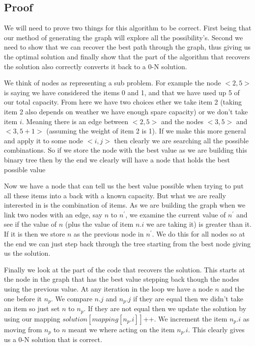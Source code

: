 \documentclass{article}
\begin{document}
		\break
		\subsection{Proof}
			We will need to prove two things for this algorithm to be correct. First being that our method of generating the graph will explore all the possibility's. Second we need to show that we can recover the best path through the graph, thus giving us the optimal solution and finally show that the part of the algorithm that recovers the solution also correctly converts it back to a 0-N solution.	\newline	
		
			We think of nodes as representing a sub problem. For example the node $<2, 5>$ is saying we have considered the items 0 and 1, and that we have used up 5 of our total capacity. From here we have two choices ether we take item 2 (taking item 2 also depends on weather we have enough spare capacity) or we don't take item $i$. Meaning there is an edge between $<2, 5>$ and the nodes $<3, 5>$ and $<3, 5 + 1>$ (assuming the weight of item 2 is 1). If we make this more general and apply it to some node $<i, j>$ then clearly we are searching all the possible combinations. So if we store the node with the best value as we are building this binary tree then by the end we clearly will have a node that holds the best possible value\newline
			
			Now we have a node that can tell us the best value possible when trying to put all these items into a back with a known capacity. But what we are really interested in is the combination of items. As we are building the graph when we link two nodes with an edge, say  $n$ to $n^\prime$, we examine the current value of $n^\prime$ and see if the value of $n$ (plus the value of item $n.i$ we are taking it) is greater than it. If it is then we store $n$ as the previous node in $n^\prime$. We do this for all nodes so at the end we can just step back through the tree starting from the best node giving us the solution.\newline
			
			Finally we look at the part of the code that recovers the solution. This starts at the node in the graph that has the best value stepping back though the nodes using the previous value. At any iteration in the loop we have a node $n$ and the one before it $n_p$. We compare $n.j$ and $n_p.j$ if they are equal then we didn't take an item so just set $n$ to $n_p$. If they are not equal then we update the solution by using our mapping $solution[mapping[n_p.i]]$++. We increment the item $n_p.i$ as moving from $n_p$ to $n$ meant we where acting on the item $n_p.i$. This clearly gives us a 0-N solution that is correct.
			
\end{document}
